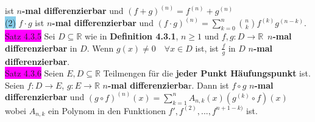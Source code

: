 \documentclass[landscape, 10pt]{article}
\newcommand{\R}{\mathbb{R}}
\begin{document}
\begin{multicols}{3}
                            ist $n$\textbf{-mal differenzierbar} und 
                            \textcolor{NavyBlue}{$(f+g)^{(n)}=f^{(n)}+g^{(n)}$}\\
                     \colorbox{SkyBlue}{(2)} \textcolor{NavyBlue}{$f\cdot g$}
                            ist $n$\textbf{-mal differenzierbar} 
                            und \textcolor{NavyBlue}{
                            $(f\cdot g)^{(n)}
                            =\sum_{k=0}^n\binom{n}{k}f^{(k)}g^{(n-k)}$}.\\
              \colorbox{magenta}{Satz 4.3.5} 
                     Sei \textcolor{NavyBlue}{$D\subseteq\R$} wie in 
                     \textbf{Definition 4.3.1}, 
                     \textcolor{NavyBlue}{$n\geqslant1$} und 
                     \textcolor{NavyBlue}{$f,g:D\longrightarrow\R$}\,
                     \textbf{$n$-mal differenzierbar} in 
                     \textcolor{NavyBlue}{$D$}. Wenn 
                     \textcolor{NavyBlue}{$g(x)\neq0\quad\forall x\in D$} ist, 
                     ist \textcolor{NavyBlue}{$\frac{f}{g}$} 
                     in \textcolor{NavyBlue}{$D$} 
                     $n$\textbf{-mal differenzierbar}. \\
              \colorbox{magenta}{Satz 4.3.6} 
                     Seien \textcolor{NavyBlue}{$E,D\subseteq\R$} Teilmengen 
                     für die \textbf{jeder Punkt Häufungspunkt} ist. Seien 
                     \textcolor{NavyBlue}{$f:D\longrightarrow E$},
                     \textcolor{NavyBlue}{$g:E\longrightarrow\R$} 
                     \textbf{$n$-mal differenzierba}r.
                     Dann ist \textcolor{NavyBlue}{$f\circ g$} 
                     $n$\textbf{-mal differenzierbar} und 
                     \textcolor{NavyBlue}{
                     $(g\circ f)^{(n)}(x)
                     =\sum_{k=1}^nA_{n,k}(x)(g^{(k)}\circ f)(x)$}
                     wobei \textcolor{NavyBlue}{$A_{n,k}$} 
                     ein Polynom in den Funktionen 
                     \textcolor{NavyBlue}{$f',f^{(2)},...,f^{n+1-k)}$} ist.

\end{multicols}
\end{document}
